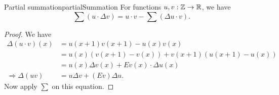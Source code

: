 \documentclass[language=english]{../../Template/TemplateLecture}
\begin{document}
\begin{thm}{Partial summation}{partialSummation}
    For functions $u, v: \mathbb{Z} \to \mathbb{R}$, we have
    \begin{equation}
        \sum (u \cdot \Delta v) = u \cdot v - \sum (\Delta u \cdot v).
    \end{equation}
\end{thm}

\begin{proof}
    We have 
    \begin{equation}
        \begin{split}
            \Delta (u \cdot v)(x) &= u(x+1)v(x+1) - u(x) v(x) \\
            &= u(x)(v(x + 1) - v(x)) + v(x + 1)(u(x + 1) - u(x)) \\
            &= u(x) \Delta v(x) + Ev(x) \cdot \Delta u(x) \\
            \Rightarrow \Delta (uv) &= u\Delta v + (Ev) \Delta u.
        \end{split}
    \end{equation}
    Now apply $\sum$ on this equation.
\end{proof}
\end{document}
